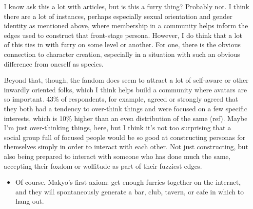 I know ask this a lot with articles, but is this a furry thing? Probably not. I think there are a lot of instances, perhaps especially sexual orientation and gender identity as mentioned above, where membership in a community helps inform the edges used to construct that front-stage persona. However, I do think that a lot of this ties in with furry on some level or another. For one, there is the obvious connection to character creation, especially in a situation with such an obvious difference from oneself as species.

Beyond that, though, the fandom does seem to attract a lot of self-aware or other inwardly oriented folks, which I think helps build a community where avatars are so important. 43\% of respondents, for example, agreed or strongly agreed that they both had a tendency to over-think things and were focused on a few specific interests, which is 10\% higher than an even distribution of the same (ref). Maybe I'm just over-thinking things, here, but I think it's not too surprising that a social group full of focused people would be so good at constructing personas for themselves simply in order to interact with each other. Not just constructing, but also being prepared to interact with someone who has done much the same, accepting their foxdom or wolfitude as part of their fuzziest edges.

\begin{itemize}
\tightlist
\item
  Of course. Makyo's first axiom: get enough furries together on the internet, and they will spontaneously generate a bar, club, tavern, or cafe in which to hang out.
\end{itemize}
